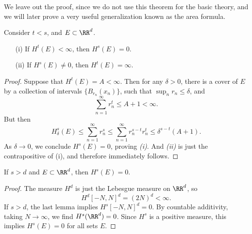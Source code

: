 \begin{comment}
	If $\psi: U \to V$ is any diffeomorphism, then for $y \in V$ with $\psi(x) = y$,
	\[ D(\phi \circ \psi^{-1})(y) = D\phi(x) \cdot (D\psi)(y)^{-1}. \]
	Thus
	\[ J_{\phi \circ \psi^{-1}}(y) = J_\phi(x) \cdot |\det(D\psi)(y)|^{-1}. \]
	In particular, the change of variables formula implies that
	\begin{align*}
		\int_K J_\phi(x)\; dx &= \int_{\psi(K)} J_\phi(\psi^{-1}(y)) |\det(D \psi)(y)|^{-1}\; dy = \int_{\psi(K)} J_{\phi \circ \psi^{-1}}(y)\; dy.
	\end{align*}
	Thus the integral quantity is invariant under changes of coordinates in $\RR^m$. Consider a cover of $K$ by finitely many balls $\{ B_{r_1}(x_1), \dots, B_{r_N}(x_N) \}$, such that for each $i \in \{ 1, \dots, N \}$ there is a permutation of coordinates $\pi_i: \RR^n \to \RR^n$, a smooth diffeomorphism $\psi_i: U \cap B_{2r_1}(x_1) \to V_i$, and a smooth function $f: V_i \to \RR^{n-m}$ such that for $x \in V_i$,
	\[ (\pi_i \circ \phi \circ \psi_i^{-1})(x) = (x,f_i(x)). \]
	s
\end{proof}
\end{comment}

We leave out the proof, since we do not use this theorem for the basic theory, and we will later prove a very useful generalization known as the area formula.

\begin{lemma}
	Consider $t < s$, and $E \subset \RR^d$.
	\begin{enumerate}
		\item[(i)] If $H^t(E) < \infty$, then $H^s(E) = 0$.
		\item[(ii)] If $H^s(E) \neq 0$, then $H^t(E) = \infty$.
	\end{enumerate}
\end{lemma}
\begin{proof}
	Suppose that $H^t(E) = A < \infty$. Then for any $\delta > 0$, there is a cover of $E$ by a collection of intervals $\{ B_{r_n}(x_n) \}$, such that $\sup_n r_n \leq \delta$, and
	\[ \sum_{n = 1}^\infty r_n^t \leq A + 1 < \infty. \]
	But then
	\[ H^s_\delta(E) \leq \sum_{n = 1}^\infty r_n^s \leq \sum_{n = 1}^\infty r_n^{s-t} r_n^t \leq \delta^{s-t} (A+1). \]
	As $\delta \to 0$, we conclude $H^s(E) = 0$, proving \emph{(i)}. And \emph{(ii)} is just the contrapositive of (i), and therefore immediately follows.
\end{proof}

\begin{corollary}
	If $s > d$ and $E \subset \RR^d$, then $H^s(E) = 0$.
\end{corollary}
\begin{proof}
	The measure $H^d$ is just the Lebesgue measure on $\RR^d$, so
	\[ H^d[-N,N]^d = (2N)^d < \infty. \]
	If $s > d$, the last lemma implies $H^s[-N,N]^d = 0$. By countable additivity, taking $N \to \infty$, we find $H^s(\RR^d) = 0$. Since $H^s$ is a positive measure, this implies $H^s(E) = 0$ for all sets $E$.
\end{proof}

